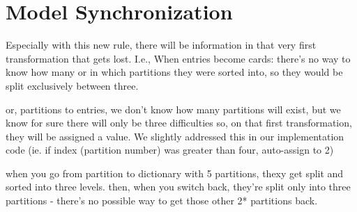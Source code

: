 \newpage
\section{Model Synchronization}
\genHeader

Especially with this new rule, there will be information in that very first transformation that gets lost. I.e., When entries become cards: there's no way to
know how many or in which partitions they were sorted into, so they would be split exclusively between three.

or, partitions to entries, we don't know how many partitions will exist, but we know for sure there will only be three difficulties so, on that first
transformation, they will be assigned a value. We slightly addressed this in our implementation code (ie. if index (partition number) was greater than four,
auto-assign to 2) 

when you go from partition to dictionary with 5 partitions, thexy get split and sorted into three levels. then, when you switch back, they're split only into
three partitions - there's no possible way to get those other 2* partitions back.
